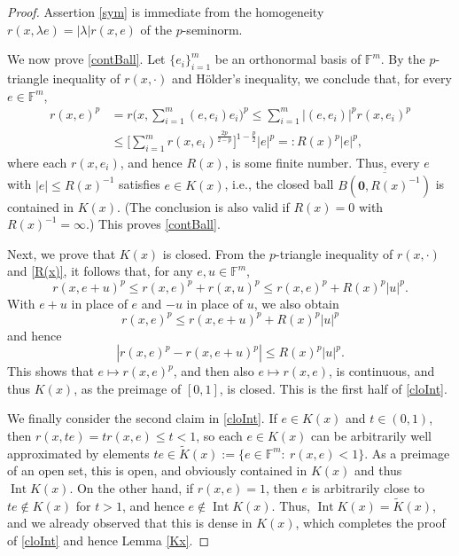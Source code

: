 \documentclass[11pt, reqno]{amsart}
\theoremstyle{definition}
\theoremstyle{remark}
\numberwithin{equation}{section}
\newcommand{\F}{\mathbb F}
\newcommand{\abs}[1]{|#1|}
\begin{document}
\begin{proof}
Assertion \eqref{sym} is immediate from the homogeneity
$r(x,\lambda e)=\abs{\lambda}r(x,e)$ of the $p$-seminorm.

We now prove \eqref{contBall}.
Let $\{e_i\}_{i=1}^m$ be an orthonormal basis of $\F^m$.
By the $p$-triangle inequality of $r(x,\cdot)$
and H\"older's inequality, we conclude that, for every $e\in\F^m$,
\begin{equation}\label{R(x)}
\begin{split}
r(x,e)^p
&=r\Bigg( x,\sum_{i=1}^m(e,e_i)e_i\Bigg) ^p
\leq \sum_{i=1}^m \abs{(e,e_i)}^p r(x,e_i)^p \\
&\leq\Bigg[ \sum_{i=1}^m r(x,e_i)^{\frac{2p}{2-p}}\Bigg]^{1-\frac{p}{2}}\abs{e}^p
=:R(x)^p\abs{e}^p,
\end{split}\end{equation}
where each $r(x,e_i)$, and hence $R(x)$, is some finite number.
Thus, every $e$ with $\abs{e}\leq R(x)^{-1}$
satisfies $e\in K(x)$, i.e., the closed ball $\overline{B(\mathbf 0,R(x)^{-1})}$
is contained in $K(x)$.
(The conclusion is also valid if $R(x)=0$ with $R(x)^{-1}=\infty$.)
This proves \eqref{contBall}.

Next, we prove that $K(x)$ is closed.
From the $p$-triangle inequality of $r(x,\cdot)$ and \eqref{R(x)},
it follows that, for any $e,u\in\F^m$,
\begin{equation*}
r(x,e+u)^p
\leq r(x,e)^p+r(x,u)^p
\leq r(x,e)^p+R(x)^p\abs{u}^p.
\end{equation*}
With $e+u$ in place of $e$ and $-u$ in place of $u$, we also obtain
\begin{equation*}
r(x,e)^p\leq r(x,e+u)^p+R(x)^p\abs{u}^p
\end{equation*}
and hence
\begin{equation*}
\abs{r(x,e)^p-r(x,e+u)^p}
\leq R(x)^p\abs{u}^p.
\end{equation*}
This shows that $e\mapsto r(x,e)^p$, and then also $e\mapsto r(x,e)$,
is continuous, and thus $K(x)$, as the preimage of $[0,1]$, is closed.
This is the first half of \eqref{cloInt}.

We finally consider the second claim in \eqref{cloInt}.
If $e\in K(x)$ and $t\in(0,1)$, then $r(x,te)=t r(x,e)\leq t<1$,
so each $e\in K(x)$ can be arbitrarily well approximated by
elements $te\in\widetilde K(x):=\{e\in\F^m:\ r(x,e)<1\}$.
As a preimage of an open set, this is open, and obviously contained in $K(x)$ and thus $\operatorname{Int}K(x)$. On the other hand, if $r(x,e)=1$, then $e$ is arbitrarily close to $te\notin K(x)$ for $t>1$, and hence $e\notin\operatorname{Int}K(x)$. Thus, $\operatorname{Int} K(x)=\widetilde K(x)$, and we already observed that this is dense in $K(x)$,
which completes the proof of \eqref{cloInt} and hence Lemma \ref{Kx}.
\end{proof}
\end{document}
